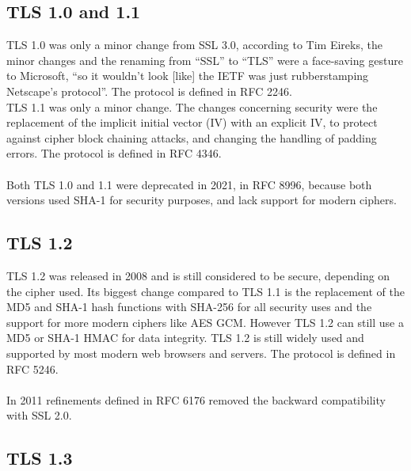 \subsection{TLS 1.0 and 1.1}
TLS 1.0 was only a minor change from SSL 3.0, according to Tim Eireks, the minor changes and the renaming from ``SSL'' to ``TLS'' were a face-saving gesture to Microsoft, ``so it wouldn't look [like] the IETF was just rubberstamping Netscape's protocol''. The protocol is defined in RFC 2246.
\\
TLS 1.1 was only a minor change. The changes concerning security were the replacement of the implicit initial vector (IV) with an explicit IV, to protect against cipher block chaining attacks, and changing the handling of padding errors. The protocol is defined in RFC 4346.
\\\\
Both TLS 1.0 and 1.1 were deprecated in 2021, in RFC 8996, because both versions used SHA-1 for security purposes, and lack support for modern ciphers.

\subsection{TLS 1.2}

TLS 1.2 was released in 2008 and is still considered to be secure, depending on the cipher used. Its biggest change compared to TLS 1.1 is the replacement of the MD5 and SHA-1 hash functions with SHA-256 for all security uses and the support for more modern ciphers like AES GCM. However TLS 1.2 can still use a MD5 or SHA-1 HMAC for data integrity. TLS 1.2 is still widely used and supported by most modern web browsers and servers. The protocol is defined in RFC 5246.
\\\\
In 2011 refinements defined in RFC 6176 removed the backward compatibility with SSL 2.0.

\subsection{TLS 1.3}

